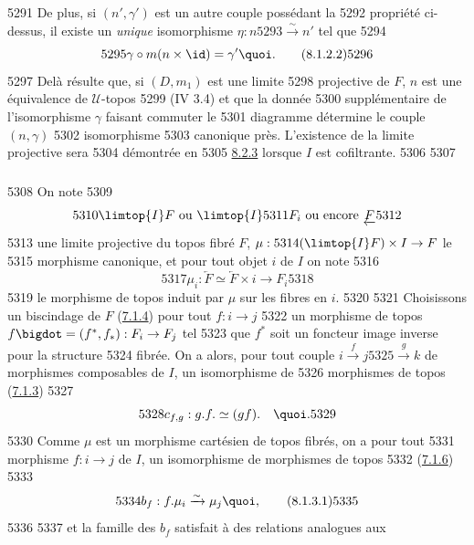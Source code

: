  5291	De plus, si $(n', \gamma')$ est un autre couple possédant la
  5292	propriété ci-dessus, il existe un \emph{unique} isomorphisme $\eta : n
  5293	\xrightarrow{\sim} n'$ tel que
  5294	\begin{equation*}
  5295	\gamma \circ m (n \times \id) = \gamma'{\quoi}.\tag{8.1.2.2}
  5296	\end{equation*}
  5297	De\pageoriginale là résulte que, si $(D, m_1)$ est une limite
  5298	projective de $F$, $n$ est une équivalence de $𝒰$-topos
  5299	(IV 3.4) et que la donnée
  5300	supplémentaire de l'isomorphisme $\gamma$ faisant commuter le
  5301	diagramme  détermine le couple $(n, \gamma)$
  5302	isomorphisme
  5303	canonique près. L'existence de la limite projective sera
  5304	démontrée en
  5305	\hyperref[VI.thm8.2.3]{8.2.3} lorsque $I$ est cofiltrante.
  5306	
  5307	\subsubsection{}
  5308	On note
  5309	$$
  5310	\limtop{I} F \mbox{ ou } \limtop{I}
  5311	F_i \mbox{ ou encore } \underleftarrow{F}
  5312	$$
  5313	une limite projective du topos fibré $F$, $\mu :
  5314	(\limtop{I} F) \times I \to F$ le
  5315	morphisme canonique, et pour tout objet $i$ de $I$ on note
  5316	$$
  5317	\mu_i : \underleftarrow{F} \simeq \underleftarrow{F} \times {i} \to F_{i}
  5318	$$
  5319	le morphisme de topos induit par $\mu$ sur les fibres en $i$.
  5320	
  5321	Choisissons un biscindage de $F$ (\hyperref[VI.subsubsec7.1.4]{7.1.4}) \ie pour tout $f : i \to j$
  5322	un morphisme de topos $f\bigdot = (f^{\ast}, f_{\ast}) : F_i \to F_j$ tel
  5323	que $f^{\ast}$ soit un foncteur image inverse pour la structure
  5324	fibrée. On a alors, pour tout couple $i \xrightarrow{f} j
  5325	\xrightarrow{g} k$ de morphismes composables de $I$, un isomorphisme de
  5326	morphismes de topos (\hyperref[VI.subsubsec7.1.3]{7.1.3})
  5327	$$
  5328	c_{f, g} : g.f. \simeq (gf).\quad {\quoi}.
  5329	$$
  5330	Comme $\mu$ est un morphisme cartésien de topos fibrés, on a pour tout
  5331	morphisme $f : i \to j$ de $I$, un isomorphisme de morphismes de topos
  5332	(\hyperref[VI.subsubsec7.1.6]{7.1.6})
  5333	\begin{equation*}
  5334	b_f  : f. \mu_i \xrightarrow{\sim} \mu_j{\quoi},\tag{8.1.3.1}
  5335	\end{equation*}
  5336	
  5337	et la famille des $b_f$ satisfait à des relations analogues aux
